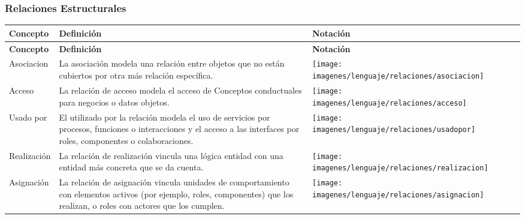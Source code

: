 \subsubsection{Relaciones Estructurales}
\begin{center}
	\begin{longtable}[h]{| >{\centering\arraybackslash}m{3cm} | >{\arraybackslash}m{6cm} | p{4cm} | p{5cm} | p{4cm} |}
		
		\hline
		\textbf{Concepto} &  \centering \textbf{Definición} & \textbf{Notación} \\
		\hline
		\endfirsthead
		
		
		\hline
		\textbf{Concepto} &  \centering \textbf{Definición} & \textbf{Notación} \\
		\hline
		\endhead
		
		Asociacion       
		& \vspace{1mm} La asociación modela una relación entre
		objetos que no están cubiertos por otra más
		relación específica.        
		&\texttt{[image: imagenes/lenguaje/relaciones/asociacion]}  \\ \hline
		
		Acceso
		& \vspace{1mm} La relación de acceso modela el acceso de
		Conceptos conductuales para negocios o datos
		objetos.            
		& \texttt{[image: imagenes/lenguaje/relaciones/acceso]}  \\ \hline
		
		Usado por        
		&\vspace{1mm} El utilizado por la relación modela el uso de
		servicios por procesos, funciones o
		interacciones y el acceso a las interfaces por
		roles, componentes o colaboraciones.               
		& \texttt{[image: imagenes/lenguaje/relaciones/usadopor]}  \\ \hline
		
		Realización	
		& \vspace{1mm} La relación de realización vincula una lógica
		entidad con una entidad más concreta que
		se da cuenta.              
		& \texttt{[image: imagenes/lenguaje/relaciones/realizacion]}  \\ \hline
		
		Asignación &\vspace{1mm} La relación de asignación vincula unidades de
		comportamiento con elementos activos (por ejemplo, roles,
		componentes) que los realizan, o roles con
		actores que los cumplen. 
		&  \texttt{[image: imagenes/lenguaje/relaciones/asignacion]}  \\ \hline
		

\end{longtable}
\end{center}
